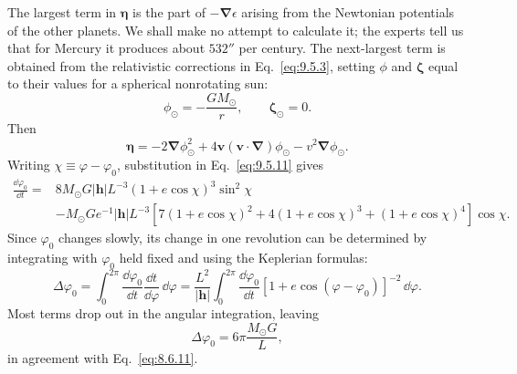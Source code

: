The largest term in \(\boldsymbol\eta\) is the part of
\(-\boldsymbol\nabla\epsilon\) arising from the Newtonian potentials of the
other planets. We shall make no attempt to calculate it; the experts tell us
that for Mercury it produces about \(532''\) per century. The next-largest
term is obtained from the relativistic corrections in
Eq.~\eqref{eq:9.5.3}, setting \(\phi\) and \(\boldsymbol\zeta\) equal to
their values for a spherical nonrotating sun:
\begin{equation}
  \phi_\odot=-\frac{GM_\odot}{r},
  \qquad
  \boldsymbol\zeta_\odot=0.
  \tag{9.5.13}\label{eq:9.5.13}
\end{equation}
Then
\begin{equation}
  \boldsymbol\eta
  =
  -2\boldsymbol\nabla\phi_\odot^2
  +4\mathbf v(\mathbf v\cdot\boldsymbol\nabla)\phi_\odot
  -v^2\boldsymbol\nabla\phi_\odot.
  \tag{9.5.14}\label{eq:9.5.14}
\end{equation}
Writing \(\chi\equiv\varphi-\varphi_0\), substitution in
Eq.~\eqref{eq:9.5.11} gives
\begin{equation}
  \begin{split}
  \frac{\dd\varphi_0}{\dd t}
  ={}&
  8M_\odot G|\mathbf h|L^{-3}
  (1+e\cos\chi)^3\sin^2\chi\\
  &-M_\odot G e^{-1}|\mathbf h|L^{-3}
  \left[
    7(1+e\cos\chi)^2
    +4(1+e\cos\chi)^3
    +(1+e\cos\chi)^4
  \right]\cos\chi.
  \end{split}
  \tag{9.5.15}\label{eq:9.5.15}
\end{equation}
Since \(\varphi_0\) changes slowly, its change in one revolution can be
determined by integrating with \(\varphi_0\) held fixed and using the
Keplerian formulas:
\begin{equation}
  \Delta\varphi_0
  =
  \int_0^{2\pi}\frac{\dd\varphi_0}{\dd t}
  \frac{\dd t}{\dd\varphi}\,\dd\varphi
  =
  \frac{L^2}{|\mathbf h|}
  \int_0^{2\pi}
  \frac{\dd\varphi_0}{\dd t}
  [1+e\cos(\varphi-\varphi_0)]^{-2}\,\dd\varphi.
  \tag{9.5.16}\label{eq:9.5.16}
\end{equation}
Most terms drop out in the angular integration, leaving
\begin{equation}
  \Delta\varphi_0=6\pi\frac{M_\odot G}{L},
  \tag{9.5.17}\label{eq:9.5.17}
\end{equation}
in agreement with Eq.~\eqref{eq:8.6.11}.

